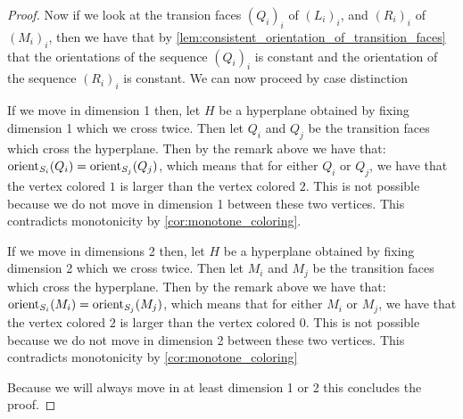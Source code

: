 \begin{proof}
	Now if we look at the transion faces $\left(Q_i\right)_i$ of $\left(L_i \right)_i$, and $\left(R_i\right)_i$ of $\left(M_i\right)_i$, then we have that by \cref{lem:consistent_orientation_of_transition_faces} that the orientations of the sequence $\left(Q_i\right)_i$ is constant and the orientation of the sequence $\left(R_i\right)_i$ is constant. We can now proceed by case distinction
	\begin{case}{1}
		If we move in dimension 1 then, let $H$ be a hyperplane obtained by fixing dimension 1 which we cross twice. Then let $Q_i$ and $Q_j$ be the transition faces which cross the hyperplane. Then by the remark above we have that: $\operatorname{orient}_{S_i}(Q_i) = \operatorname{orient}_{S_j}(Q_j)$, which means that for either $Q_i$ or $Q_j$, we have that the vertex colored $1$ is larger than the vertex colored $2$. This is not possible because we do not move in dimension 1 between these two vertices. This contradicts monotonicity by \cref{cor:monotone_coloring}.
	\end{case}
	\begin{case}{2}
		If we move in dimensions 2 then, let $H$ be a hyperplane obtained by fixing dimension 2 which we cross twice. Then let $M_i$ and $M_j$ be the transition faces which cross the hyperplane. Then by the remark above we have that: $\operatorname{orient}_{S_i}(M_i) = \operatorname{orient}_{S_j}(M_j)$, which means that for either $M_i$ or $M_j$, we have that the vertex colored $2$ is larger than the vertex colored $0$. This is not possible because we do not move in dimension 2 between these two vertices. This contradicts monotonicity by \cref{cor:monotone_coloring}
	\end{case}
	Because we will always move in at least dimension 1 or 2 this concludes the proof.
\end{proof}
